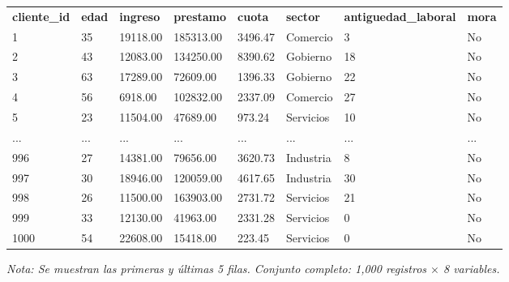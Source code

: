 

\begin{table}[htbp]

\centering

\begin{adjustbox}{max width=\textwidth}

\begin{tabular}{llllllll}

\rowcolor{ThemeBackground}
\rule{0pt}{0.45cm}
\textcolor{ThemeGold}{\bfseries cliente\_id} & \textcolor{ThemeGold}{\bfseries edad} & \textcolor{ThemeGold}{\bfseries ingreso} & \textcolor{ThemeGold}{\bfseries prestamo} & \textcolor{ThemeGold}{\bfseries cuota} & \textcolor{ThemeGold}{\bfseries sector} & \textcolor{ThemeGold}{\bfseries antiguedad\_laboral} & \textcolor{ThemeGold}{\bfseries mora} \\

1 & 35 & 19118.00 & 185313.00 & 3496.47 & Comercio & 3 & No \\
2 & 43 & 12083.00 & 134250.00 & 8390.62 & Gobierno & 18 & No \\
3 & 63 & 17289.00 & 72609.00 & 1396.33 & Gobierno & 22 & No \\
4 & 56 & 6918.00 & 102832.00 & 2337.09 & Comercio & 27 & No \\
5 & 23 & 11504.00 & 47689.00 & 973.24 & Servicios & 10 & No \\
... & ... & ... & ... & ... & ... & ... & ... \\
996 & 27 & 14381.00 & 79656.00 & 3620.73 & Industria & 8 & No \\
997 & 30 & 18946.00 & 120059.00 & 4617.65 & Industria & 30 & No \\
998 & 26 & 11500.00 & 163903.00 & 2731.72 & Servicios & 21 & No \\
999 & 33 & 12130.00 & 41963.00 & 2331.28 & Servicios & 0 & No \\
1000 & 54 & 22608.00 & 15418.00 & 223.45 & Servicios & 0 & No \\
\bottomrule
\end{tabular}

\end{adjustbox}

\vspace{0.15cm}
{\raggedright\sffamily\footnotesize\color{ThemeMuted}
\textit{Nota: Se muestran las primeras y últimas 5 filas. Conjunto completo: 1,000 registros $\times$ 8 variables.}}

\end{table}
